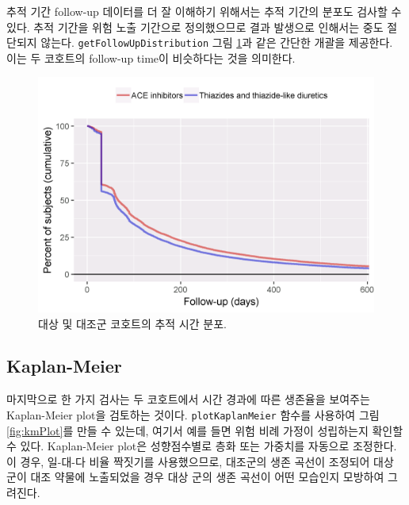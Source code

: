 \documentclass[10.5pt]{book}
\theoremstyle{definition}
\theoremstyle{definition}
\theoremstyle{definition}
\theoremstyle{remark}
\begin{document}
추적 기간 follow-up 데이터를 더 잘 이해하기 위해서는 추적 기간의 분포도
검사할 수 있다. 추적 기간을 위험 노출 기간으로 정의했으므로 결과
발생으로 인해서는 중도 절단되지 않는다. \texttt{getFollowUpDistribution}
그림 \ref{fig:followUp}과 같은 간단한 개괄을 제공한다. 이는 두 코호트의
follow-up time이 비슷하다는 것을 의미한다.

\begin{figure}

{\centering \includegraphics[width=0.8\linewidth]{images/PopulationLevelEstimation/followUp} 

}

\caption{대상 및 대조군 코호트의 추적 시간 분포.}\label{fig:followUp}
\end{figure}

\subsection{Kaplan-Meier}\label{kaplan-meier}

마지막으로 한 가지 검사는 두 코호트에서 시간 경과에 따른 생존율을
보여주는 Kaplan-Meier plot을 검토하는 것이다. \texttt{plotKaplanMeier}
함수를 사용하여 그림 \ref{fig:kmPlot}를 만들 수 있는데, 여기서 예를 들면
위험 비례 가정이 성립하는지 확인할 수 있다. Kaplan-Meier plot은
성향점수별로 층화 또는 가중치를 자동으로 조정한다. 이 경우, 일-대-다
비율 짝짓기를 사용했으므로, 대조군의 생존 곡선이 조정되어 대상 군이 대조
약물에 노출되었을 경우 대상 군의 생존 곡선이 어떤 모습인지 모방하여
그려진다. 
\end{document}
